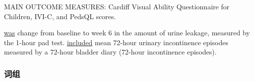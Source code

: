 \documentclass[a4paper]{ctexbook}
\begin{document}
    \begin{eg}[label={eg:2s5-1}]{}
      MAIN OUTCOME MEASURES: Cardiff Visual Ability Questionnaire for Children, IVI-C, and PedsQL scores.
    \end{eg}

    \begin{eg}[label={eg:2s5-2}]{}
       \uline{was} change from baseline to week 6 in the amount of urine leakage, measured by the 1-hour pad test.  \uline{included} mean 72-hour urinary incontinence episodes measured by a 72-hour bladder diary (72-hour incontinence episodes).
    \end{eg}

    \subsubsection{词组}
\end{document}

